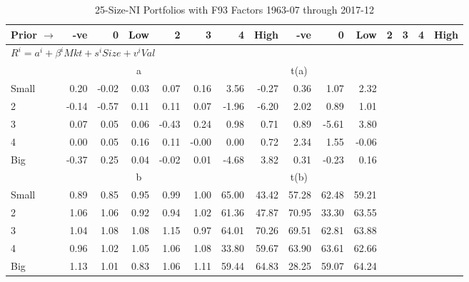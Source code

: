 
\begin{table}[!ht]
\footnotesize
\centering
\caption{25-Size-NI Portfolios with F93 Factors 1963-07 through 2017-12}
\begin{tabular}{lrrrrrrrrrrrrrr}
  \toprule
    Prior $\rightarrow$ & -ve & 0 & Low & 2 & 3 & 4 & High & -ve & 0 & Low & 2 & 3 & 4 & High \\ 
  \midrule
  \multicolumn{11}{l}{$R^i=a^i+\beta^iMkt+s^iSize+v^iVal$} \\

  
    
      & \multicolumn{5}{c}{a} & \multicolumn{5}{c}{t(a)}
    
    \\
      \cmidrule(r){2-6} \cmidrule(r){7-11}

    Small   & 0.20  & -0.02  & 0.03  & 0.07  & 0.16  & 3.56  & -0.27  & 0.36  & 1.07  & 2.32  \\
         2  & -0.14  & -0.57  & 0.11  & 0.11  & 0.07  & -1.96  & -6.20  & 2.02  & 0.89  & 1.01  \\
         3  & 0.07  & 0.05  & 0.06  & -0.43  & 0.24  & 0.98  & 0.71  & 0.89  & -5.61  & 3.80  \\
         4  & 0.00  & 0.05  & 0.16  & 0.11  & -0.00  & 0.00  & 0.72  & 2.34  & 1.55  & -0.06  \\
    Big     & -0.37  & 0.25  & 0.04  & -0.02  & 0.01  & -4.68  & 3.82  & 0.31  & -0.23  & 0.16  \\

  
    
      & \multicolumn{5}{c}{b} & \multicolumn{5}{c}{t(b)}
    
    \\
      \cmidrule(r){2-6} \cmidrule(r){7-11}

    Small   & 0.89  & 0.85  & 0.95  & 0.99  & 1.00  & 65.00  & 43.42  & 57.28  & 62.48  & 59.21  \\
         2  & 1.06  & 1.06  & 0.92  & 0.94  & 1.02  & 61.36  & 47.87  & 70.95  & 33.30  & 63.55  \\
         3  & 1.04  & 1.08  & 1.08  & 1.15  & 0.97  & 64.01  & 70.26  & 69.51  & 62.81  & 63.88  \\
         4  & 0.96  & 1.02  & 1.05  & 1.06  & 1.08  & 33.80  & 59.67  & 63.90  & 63.61  & 62.66  \\
    Big     & 1.13  & 1.01  & 0.83  & 1.06  & 1.11  & 59.44  & 64.83  & 28.25  & 59.07  & 64.24  \\

  
    

\end{tabular}
\end{table}
